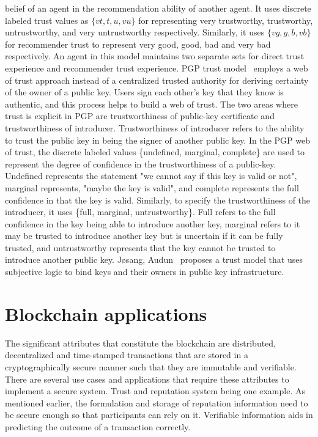 belief of an agent in the recommendation ability of another agent. It uses
discrete labeled trust values as $\{vt, t, u, vu\}$ for representing very
trustworthy, trustworthy, untrustworthy, and very untrustworthy respectively.
Similarly, it uses $\{vg, g, b, vb\}$ for recommender trust to represent very
good, good, bad and very bad respectively. An agent in this model maintains two
separate sets for direct trust experience and recommender trust experience. PGP
trust model~\cite{abdul1997pgp} employs a web of trust approach instead of a
centralized trusted authority for deriving certainty of the owner of a public
key. Users sign each other's key that they know is authentic, and this process
helps to build a web of trust. The two areas where trust is explicit in PGP are
trustworthiness of public-key certificate and trustworthiness of introducer.
Trustworthiness of introducer refers to the ability to trust the public key in
being the signer of another public key.  In the PGP web of trust, the discrete
labeled values \{undefined, marginal, complete\} are used to represent the
degree of confidence in the trustworthiness of a public-key. Undefined
represents the statement "we cannot say if this key is valid or not", marginal
represents, "maybe the key is valid", and complete represents the full
confidence in that the key is valid.  Similarly, to specify the trustworthiness
of the introducer, it uses \{full, marginal, untrustworthy\}. Full refers to
the full confidence in the key being able to introduce another key, marginal
refers to it may be trusted to introduce another key but is uncertain if it can
be fully trusted, and untrustworthy represents that the key cannot be trusted
to introduce another public key. Jøsang, Audun~\cite{josang1999algebra}
proposes a trust model that uses subjective logic to bind keys and their owners
in public key infrastructure.  

\section{Blockchain applications}
The significant attributes that constitute the blockchain are distributed,
decentralized and time-stamped transactions that are stored in a
cryptographically secure manner such that they are immutable and verifiable.
There are several use cases and applications that require these attributes to
implement a secure system. Trust and reputation system being one example. As
mentioned earlier, the formulation and storage of reputation information need
to be secure enough so that participants can rely on it. Verifiable information
aids in predicting the outcome of a transaction correctly. \par 


